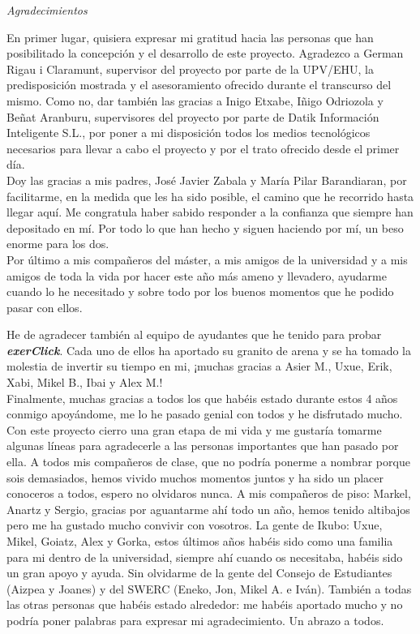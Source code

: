 \begin{flushright}
	\Large\textit{Agradecimientos}
\end{flushright}

En primer lugar, quisiera expresar mi gratitud hacia las personas que han posibilitado la concepción y el desarrollo de este proyecto. Agradezco a German Rigau i Claramunt, supervisor del proyecto por parte de la UPV/EHU, la predisposición mostrada y el asesoramiento ofrecido durante el transcurso del mismo. Como no, dar también las gracias a Inigo Etxabe, Iñigo Odriozola y Beñat Aranburu, supervisores del proyecto por parte de Datik Información Inteligente S.L., por poner a mi disposición todos los medios tecnológicos necesarios para llevar a cabo el proyecto y por el trato ofrecido desde el primer día.\\


Doy las gracias a mis padres, José Javier Zabala y María Pilar Barandiaran, por facilitarme, en la medida que les ha sido posible, el camino que he recorrido hasta llegar aquí. Me congratula haber sabido responder a la confianza que siempre han depositado en mí. Por todo lo que han hecho y siguen haciendo por mí, un beso enorme para los dos.\\



Por último a mis compañeros del máster, a mis amigos de la universidad y a mis amigos de toda la vida por hacer este año más ameno y llevadero, ayudarme cuando lo he necesitado y sobre todo por los buenos momentos que he podido pasar con ellos.




He de agradecer también al equipo de ayudantes que he tenido para probar \textit{\textbf{exerClick}}. Cada uno de ellos ha aportado su granito de arena y se ha tomado la molestia de invertir su tiempo en mi, ¡muchas gracias a Asier M., Uxue, Erik, Xabi, Mikel B., Ibai y Alex M.!\\

Finalmente, muchas gracias a todos los que habéis estado durante estos 4 años conmigo apoyándome, me lo he pasado genial con todos y he disfrutado mucho. Con este proyecto cierro una gran etapa de mi vida y me gustaría tomarme algunas líneas para agradecerle a las personas importantes que han pasado por ella. A todos mis compañeros de clase, que no podría ponerme a nombrar porque sois demasiados, hemos vivido muchos momentos juntos y ha sido un placer conoceros a todos, espero no olvidaros nunca. A mis compañeros de piso: Markel, Anartz y Sergio, gracias por aguantarme ahí todo un año, hemos tenido altibajos pero me ha gustado mucho convivir con vosotros. La gente de Ikubo: Uxue, Mikel, Goiatz, Alex y Gorka, estos últimos años habéis sido como una familia para mi dentro de la universidad, siempre ahí cuando os necesitaba, habéis sido un gran apoyo y ayuda. Sin olvidarme de la gente del Consejo de Estudiantes (Aizpea y Joanes) y del SWERC (Eneko, Jon, Mikel A. e Iván). También a todas las otras personas que habéis estado alrededor: me habéis aportado mucho y no podría poner palabras para expresar mi agradecimiento. Un abrazo a todos.\\

